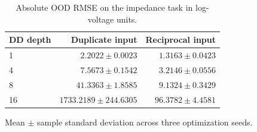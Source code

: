\begin{table}[t]
\centering
\caption{Absolute OOD RMSE on the impedance task in log-voltage units.}
\label{tab:ood-absolute-error}
\small
\begin{tabular}{@{}lrr@{}}
\toprule
DD depth & Duplicate input & Reciprocal input \\
\midrule
1 & $2.2022\pm0.0023$ & $1.3163\pm0.0423$ \\
4 & $7.5673\pm0.1542$ & $3.2146\pm0.0556$ \\
8 & $41.3363\pm1.8585$ & $9.1324\pm0.3429$ \\
16 & $1733.2189\pm244.6305$ & $96.3782\pm4.4581$ \\
\bottomrule
\end{tabular}
\par\vspace{2pt}\footnotesize Mean $\pm$ sample standard deviation across three optimization seeds.
\end{table}
